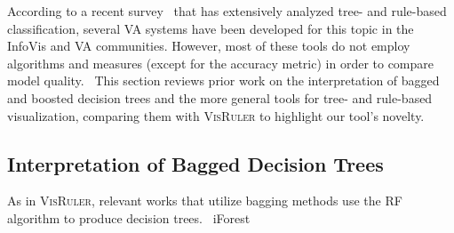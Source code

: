 According to a recent survey~\cite{Streeb2021Task} that has extensively analyzed tree- and rule-based classification, several VA systems have been developed for this topic in the \mbox{InfoVis} and VA communities. However, most of these tools do not employ algorithms and measures (except for the accuracy metric) in order to compare model quality.~\cite{Streeb2021Task} This section reviews prior work on the interpretation of bagged and boosted decision trees and the more general tools for tree- and rule-based visualization,
comparing them with \textsc{VisRuler} to highlight our tool's novelty.

\subsection{Interpretation of Bagged Decision Trees}
As in \textsc{VisRuler}, relevant works that utilize bagging methods use the RF algorithm to produce decision trees.~\cite{Zhao2019iForest,Neto2021Explainable,Eirich2022RfX,Nsch2019Colorful,Neto2021Multivariate} iForest~\cite{Zhao2019iForest}
